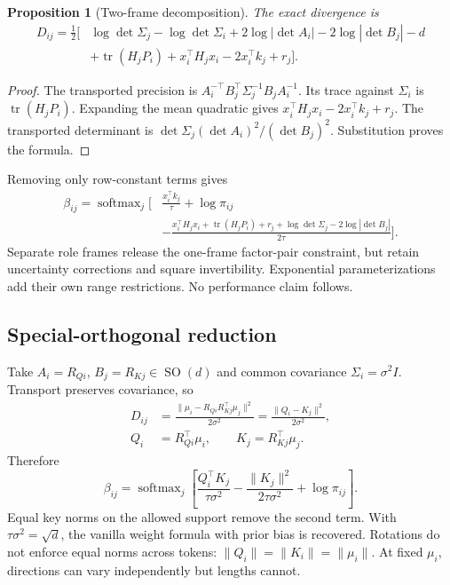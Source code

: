\documentclass[11pt,letterpaper]{article}
\newcommand{\SO}{\operatorname{SO}}
\newcommand{\tr}{\operatorname{tr}}
\newcommand{\softmax}{\operatorname{softmax}}
\newtheorem{proposition}{Proposition}[section]
\theoremstyle{remark}
\begin{document}
\begin{proposition}[Two-frame decomposition]
The exact divergence is
\begin{align}
 D_{ij}=\frac12\big[&
 \log\det\Sigma_j-\log\det\Sigma_i
 +2\log|\det A_i|-2\log|\det B_j|-d \nonumber\\
 &+\tr(H_jP_i)+x_i^\top H_jx_i-2x_i^\top k_j+r_j\big].
 \label{eq:two-kl}
\end{align}
\end{proposition}
\begin{proof}
The transported precision is
$A_i^{-\top}B_j^\top\Sigma_j^{-1}B_jA_i^{-1}$.
Its trace against $\Sigma_i$ is $\tr(H_jP_i)$. Expanding the mean quadratic gives $x_i^\top H_jx_i-2x_i^\top k_j+r_j$. The transported determinant is $\det\Sigma_j(\det A_i)^2/(\det B_j)^2$. Substitution proves the formula.
\end{proof}
Removing only row-constant terms gives
\begin{align}
 \beta_{ij}=\softmax_j\bigg[
 &\frac{x_i^\top k_j}{\tau}+\log\pi_{ij}\nonumber\\
 &-\frac{x_i^\top H_jx_i+\tr(H_jP_i)+r_j
 +\log\det\Sigma_j-2\log|\det B_j|}{2\tau}\bigg].
\end{align}
Separate role frames release the one-frame factor-pair constraint, but retain uncertainty corrections and square invertibility. Exponential parameterizations add their own range restrictions. No performance claim follows.

\subsection{Special-orthogonal reduction}
\label{sec:so}
Take $A_i=R_{Qi}$, $B_j=R_{Kj}\in\SO(d)$ and common covariance $\Sigma_i=\sigma^2I$. Transport preserves covariance, so
\begin{align}
 D_{ij}&=\frac{\|\mu_i-R_{Qi}R_{Kj}^\top\mu_j\|^2}{2\sigma^2}
 =\frac{\|Q_i-K_j\|^2}{2\sigma^2},\\
 Q_i&=R_{Qi}^\top\mu_i,\qquad K_j=R_{Kj}^\top\mu_j.
\end{align}
Therefore
\begin{equation}
 \boxed{\beta_{ij}=\softmax_j\left[
 \frac{Q_i^\top K_j}{\tau\sigma^2}
 -\frac{\|K_j\|^2}{2\tau\sigma^2}+\log\pi_{ij}\right].}
 \label{eq:so}
\end{equation}
Equal key norms on the allowed support remove the second term. With $\tau\sigma^2=\sqrt d$, the vanilla weight formula with prior bias is recovered. Rotations do not enforce equal norms across tokens: $\|Q_i\|=\|K_i\|=\|\mu_i\|$. At fixed $\mu_i$, directions can vary independently but lengths cannot.
\end{document}
